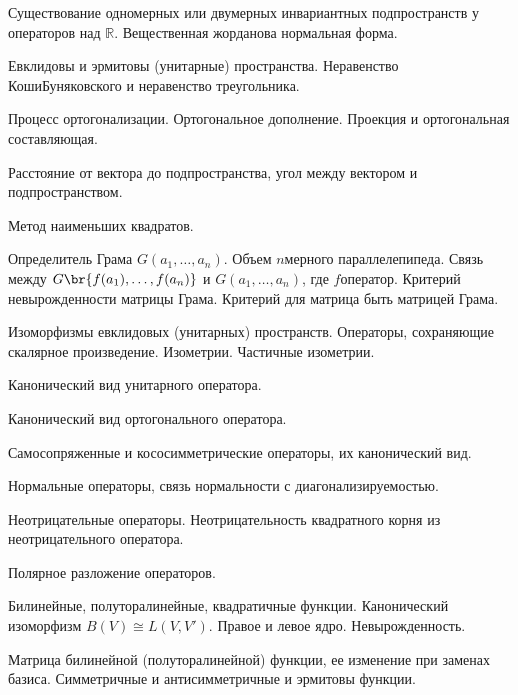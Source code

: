 \documentclass[a4paper]{article}
\begin{document}
\begin{nums}{-2}
\item Существование одномерных или двумерных инвариантных
подпространств у операторов над $\mathbb{R}$. Вещественная
жорданова нормальная форма.

\item Евклидовы   и эрмитовы    (унитарные) пространства.
Неравенство Коши\ч Буняковского  и неравенство треугольника.

\item Процесс ортогонализации.     Ортогональное дополнение.
Проекция и ортогональная составляющая.

\item Расстояние от вектора до подпространства, угол между вектором
и подпространством.

\item Метод наименьших квадратов.

\item  Определитель Грама $G(a_1,\ldots, a_n)$. Объем $n$\д мерного
параллелепипеда. Связь между $G\br{f(a_1),\ldots, f(a_n)}$ и
$G(a_1,\ldots, a_n)$, где $f$\т оператор. Критерий
невырожденности матрицы Грама. Критерий для матрица быть матрицей
Грама.

\item  Изоморфизмы евклидовых   (унитарных) пространств. Операторы,
сохраняющие скалярное произведение. Изометрии. Частичные
изометрии.

\item Канонический вид унитарного оператора.

\item  Канонический вид ортогонального оператора.

\item Самосопряженные и кососимметрические операторы, их
канонический вид.

\item Нормальные операторы, связь нормальности с
диагонализируемостью.

\item Неотрицательные   операторы. Неотрицательность   квадратного
корня из   неотрицательного оператора.

\item  Полярное разложение операторов.

\item  Билинейные, полуторалинейные, квадратичные функции.
Канонический изоморфизм $B(V)\cong L(V, V')$. Правое и левое ядро.
Невырожденность.

\item Матрица   билинейной   (полуторалинейной)   функции,   ее
изменение   при   заменах   базиса. Симметричные и антисимметричные и
эрмитовы функции.


\end{nums}
\end{document}
